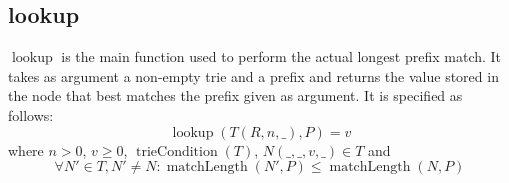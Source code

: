 \documentclass{article}
\DeclareMathOperator{\matchlength}{matchLength}
\DeclareMathOperator{\triecond}{trieCondition}
\DeclareMathOperator{\lookup}{lookup}
\begin{document}
\subsection{lookup}
$\lookup$ is the main function used to perform the actual longest prefix match.
It takes as argument a non-empty trie and a prefix and returns the value stored
in the node that best matches the prefix given as argument. It is specified as
follows:
\[
    \lookup(T(R, n, \_), P) = v
\]
where $n > 0$, $v \geq 0$, $\triecond(T)$, $N(\_, \_, v, \_) \in T$ and
\[
    \forall N'\in T, N' \neq N: \matchlength(N', P) \leq \matchlength(N, P)
\]
\end{document}
